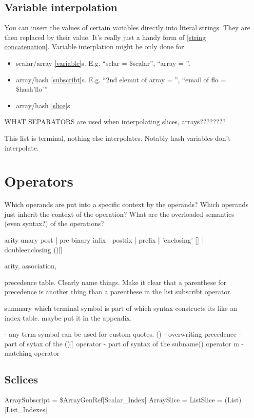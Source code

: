 \documentclass{article}
\begin{document}
\begin{description}
{\subsection{Variable interpolation}
You can insert the values of certain variables directly into literal
strings. They are then replaced by their value. It's really just a
handy form of \ref{string concatenation}. Variable interplation might
be only done for

\begin{itemize}
\item scalar/array \ref{variable}s. E.g. ``sclar = \$scalar'', ``array = \@array''.
\item array/hash \ref{subscribt}s. E.g. ``2nd elemnt of array = \@array[1]'', ``email of flo = \$hash{'flo'}''
\item array/hash \ref{slice}s
\end{itemize}

WHAT SEPARATORS are used when interpolating slices, arrays????????

This list is terminal, nothing else interpolates. Notably hash
variables don't interpolate.

\section{Operators}

Which operands are put into a specific context by the operands?
Which operands just inherit the context of the operation?
What are the overloaded semantics (even syntax?) of the operations?

arity 
  unary
    post | pre
  binary
    infix | postfix | prefix | 'enclosing' [] | doubleenclosing ()[]

arity, association,

precedence table. Clearly name things. Make it clear that a parenthese for
precedence is another thing than a parenthese in the list subscribt operator.


\redundantinfo

summary which terminal symbol is part of which syntax constructs
its like an index table. maybe put it in the appendix. 

  - any term symbol can be used for custom quotes.
() 
  - overwriting precedence
  - part of sytax of the ()[] operator
  - part of syntax of the subname() operator
m
  - matching operator


\subsection{Sclices}
ArraySubscript = \$ArrayGenRef[Scalar\_Index]    
ArraySlice = 
ListSlice = (List)[List\_Indexes]       

}
\end{description}
\end{document}
